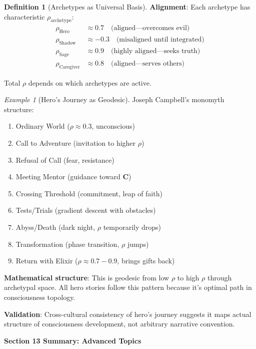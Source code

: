 \documentclass[11pt,a4paper]{article}
\theoremstyle{definition}
\newtheorem{definition}{Definition}[section]
\theoremstyle{remark}
\newtheorem{example}{Example}[section]
\begin{document}
\begin{small}
\begin{enumerate}
\begin{definition}[Archetypes as Universal Basis]
\textbf{Alignment}: Each archetype has characteristic \(\rho_{\text{archetype}}\):
\begin{align}
\rho_{\text{Hero}} &\approx 0.7 \quad \text{(aligned—overcomes evil)} \\
\rho_{\text{Shadow}} &\approx -0.3 \quad \text{(misaligned until integrated)} \\
\rho_{\text{Sage}} &\approx 0.9 \quad \text{(highly aligned—seeks truth)} \\
\rho_{\text{Caregiver}} &\approx 0.8 \quad \text{(aligned—serves others)}
\end{align}

Total \(\rho\) depends on which archetypes are active.
\end{definition}

\begin{example}[Hero's Journey as Geodesic]
Joseph Campbell's monomyth structure:
\begin{enumerate}
    \item Ordinary World (\(\rho \approx 0.3\), unconscious)
    \item Call to Adventure (invitation to higher \(\rho\))
    \item Refusal of Call (fear, resistance)
    \item Meeting Mentor (guidance toward \(\mathbf{C}\))
    \item Crossing Threshold (commitment, leap of faith)
    \item Tests/Trials (gradient descent with obstacles)
    \item Abyss/Death (dark night, \(\rho\) temporarily drops)
    \item Transformation (phase transition, \(\rho\) jumps)
    \item Return with Elixir (\(\rho \approx 0.7-0.9\), brings gifts back)
\end{enumerate}

\textbf{Mathematical structure}: This is geodesic from low \(\rho\) to high \(\rho\) through archetypal space. All hero stories follow this pattern because it's optimal path in consciousness topology.

\textbf{Validation}: Cross-cultural consistency of hero's journey suggests it maps actual structure of consciousness development, not arbitrary narrative convention.
\end{example}

\begin{mdframed}[backgroundcolor=green!10,linewidth=2pt,linecolor=green!70!black]
\textbf{Section 13 Summary: Advanced Topics}


\end{mdframed}
\end{enumerate}
\end{small}
\end{document}
